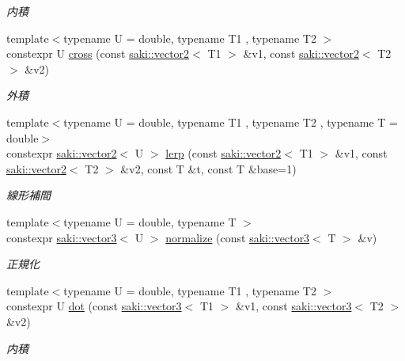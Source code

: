 \begin{DoxyCompactItemize}
\begin{DoxyCompactList}\small\item\em 内積 \end{DoxyCompactList}\item 
{\footnotesize template$<$typename U  = double, typename T1 , typename T2 $>$ }\\constexpr U \mbox{\hyperlink{namespacesaki_a457d78ffe360e1d8a78d14ec5dab38f2}{cross}} (const \mbox{\hyperlink{classsaki_1_1vector2}{saki\+::vector2}}$<$ T1 $>$ \&v1, const \mbox{\hyperlink{classsaki_1_1vector2}{saki\+::vector2}}$<$ T2 $>$ \&v2)
\begin{DoxyCompactList}\small\item\em 外積 \end{DoxyCompactList}\item 
{\footnotesize template$<$typename U  = double, typename T1 , typename T2 , typename T  = double$>$ }\\constexpr \mbox{\hyperlink{classsaki_1_1vector2}{saki\+::vector2}}$<$ U $>$ \mbox{\hyperlink{namespacesaki_aca2e4449261f40ee6f47abc49844e66c}{lerp}} (const \mbox{\hyperlink{classsaki_1_1vector2}{saki\+::vector2}}$<$ T1 $>$ \&v1, const \mbox{\hyperlink{classsaki_1_1vector2}{saki\+::vector2}}$<$ T2 $>$ \&v2, const T \&t, const T \&base=1)
\begin{DoxyCompactList}\small\item\em 線形補間 \end{DoxyCompactList}\item 
{\footnotesize template$<$typename U  = double, typename T $>$ }\\constexpr \mbox{\hyperlink{classsaki_1_1vector3}{saki\+::vector3}}$<$ U $>$ \mbox{\hyperlink{namespacesaki_aa38ed490dc1e7d5df7241eefd1c9453b}{normalize}} (const \mbox{\hyperlink{classsaki_1_1vector3}{saki\+::vector3}}$<$ T $>$ \&v)
\begin{DoxyCompactList}\small\item\em 正規化 \end{DoxyCompactList}\item 
{\footnotesize template$<$typename U  = double, typename T1 , typename T2 $>$ }\\constexpr U \mbox{\hyperlink{namespacesaki_a5be905d72bf8dc80abc703fe69fa6fec}{dot}} (const \mbox{\hyperlink{classsaki_1_1vector3}{saki\+::vector3}}$<$ T1 $>$ \&v1, const \mbox{\hyperlink{classsaki_1_1vector3}{saki\+::vector3}}$<$ T2 $>$ \&v2)
\begin{DoxyCompactList}\small\item\em 内積 \end{DoxyCompactList}\item 

\end{DoxyCompactItemize}
